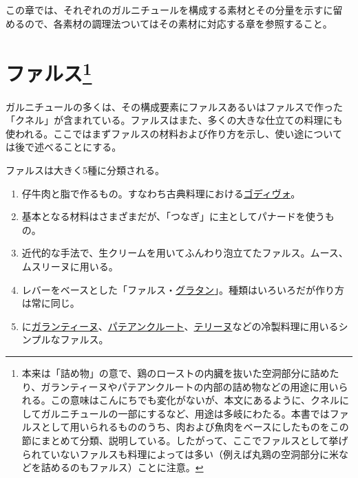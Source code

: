 この章では、それぞれのガルニチュールを構成する素材とその分量を示すに留
めるので、各素材の調理法ついてはその素材に対応する章を参照すること。

\hypertarget{serie-des-farces-diverses}{%
\section[ファルス]{\texorpdfstring{ファルス\footnote{本来は「詰め物」の意で、鶏のローストの内臓を抜いた空洞部分に詰めたり、ガランティーヌやパテアンクルートの内部の詰め物などの用途に用いられる。この意味はこんにちでも変化がないが、本文にあるように、クネルにしてガルニチュールの一部にするなど、用途は多岐にわたる。本書ではファルスとして用いられるもののうち、肉および魚肉をベースにしたものをこの節にまとめて分類、説明している。したがって、ここでファルスとして挙げられていないファルスも料理によっては多い（例えば丸鶏の空洞部分に米などを詰めるのもファルス）ことに注意。}}{ファルス}}\label{serie-des-farces-diverses}}


 

ガルニチュールの多くは、その構成要素にファルスあるいはファルスで作った
「クネル」が含まれている。ファルスはまた、多くの大きな仕立ての料理にも
使われる。ここではまずファルスの材料および作り方を示し、使い途について
は後で述べることにする。

ファルスは大きく5種に分類される。

\begin{enumerate}
\def\labelenumi{\arabic{enumi}.}
\item
  仔牛肉と脂で作るもの。すなわち古典料理における\ul{ゴディヴォ}。
\item
  基本となる材料はさまざまだが、「つなぎ」に主としてパナードを使うもの。
\item
  近代的な手法で、生クリームを用いてふんわり泡立てたファルス。ムース、ムスリーヌに用いる。
\item
  レバーをベースとした「ファルス・\ul{グラタン}」。種類はいろいろだが作り方は常に同じ。
\item
  に\protect\hyperlink{}{ガランティーヌ}、\protect\hyperlink{}{パテアンクルート}、\protect\hyperlink{}{テリーヌ}などの冷製料理に用いるシンプルなファルス。
\end{enumerate}

\newpage

